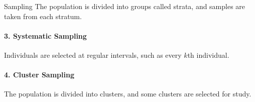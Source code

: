\documentclass[aspectratio=169]{beamer}
\begin{document}
\begin{frame}{Sampling}
The population is divided into groups called strata, and samples are
taken from each stratum.

\paragraph{\textbf{3. Systematic Sampling}}

Individuals are selected at regular intervals, such as every $k$th
individual.

\paragraph{\textbf{4. Cluster Sampling}}

The population is divided into clusters, and some clusters are selected
for study.
\end{frame}
\end{document}
